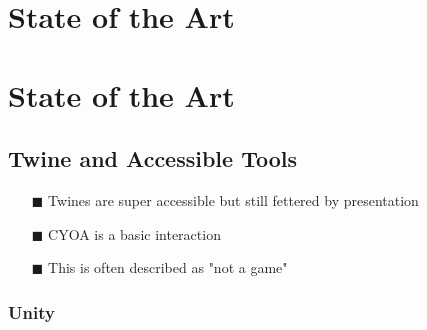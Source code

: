 
\chapter{State of the Art} %
\chapter{State of the Art} %

\label{Chapter3} %




\section{Twine and Accessible Tools}
\begin{itemize}
\item[\tiny{$\blacksquare$}] Twines are super accessible but still fettered by presentation
\item[\tiny{$\blacksquare$}] CYOA is a basic interaction
\item[\tiny{$\blacksquare$}] This is often described as "not a game"
\end{itemize}
\subsection{Unity}




